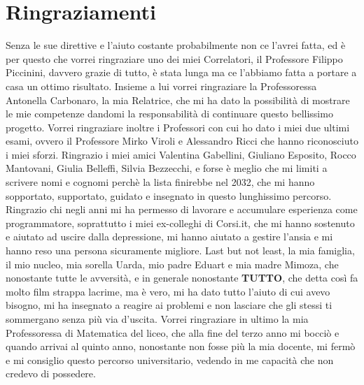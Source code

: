 \chapter*{Ringraziamenti}
\noindent Senza le sue direttive e l'aiuto costante probabilmente non ce l'avrei fatta, ed è per questo che vorrei ringraziare uno dei miei Correlatori, il Professore Filippo Piccinini, davvero grazie di tutto, è stata lunga ma ce l'abbiamo fatta a portare a casa un ottimo risultato. Insieme a lui vorrei ringraziare la Professoressa Antonella Carbonaro, la mia Relatrice, che mi ha dato la possibilità di mostrare le mie competenze dandomi la responsabilità di continuare questo bellissimo progetto. Vorrei ringraziare inoltre i Professori con cui ho dato i miei due ultimi esami, ovvero il Professore Mirko Viroli e Alessandro Ricci che hanno riconosciuto i miei sforzi. Ringrazio i miei amici Valentina Gabellini, Giuliano Esposito, Rocco Mantovani, Giulia Belleffi, Silvia Bezzecchi, e forse è meglio che mi limiti a scrivere nomi e cognomi perchè la lista finirebbe nel 2032, che mi hanno sopportato, supportato, guidato e insegnato in questo lunghissimo percorso. Ringrazio chi negli anni mi ha permesso di lavorare e accumulare esperienza come programmatore, soprattutto i miei ex-colleghi di Corsi.it, che mi hanno sostenuto e aiutato ad uscire dalla depressione, mi hanno aiutato a gestire l'ansia e mi hanno reso una persona sicuramente migliore. Last but not least, la mia famiglia, il mio nucleo, mia sorella Uarda, mio padre Eduart e mia madre Mimoza, che nonostante tutte le avversità, e in generale nonostante \textbf{TUTTO}, che detta così fa molto film strappa lacrime, ma è vero, mi ha dato tutto l'aiuto di cui avevo bisogno, mi ha insegnato a reagire ai problemi e non lasciare che gli stessi ti sommergano senza più via d'uscita. Vorrei ringraziare in ultimo la mia Professoressa di Matematica del liceo, che alla fine del terzo anno mi bocciò e quando arrivai al quinto anno, nonostante non fosse più la mia docente, mi fermò e mi consiglio questo percorso universitario, vedendo in me capacità che non credevo di possedere.